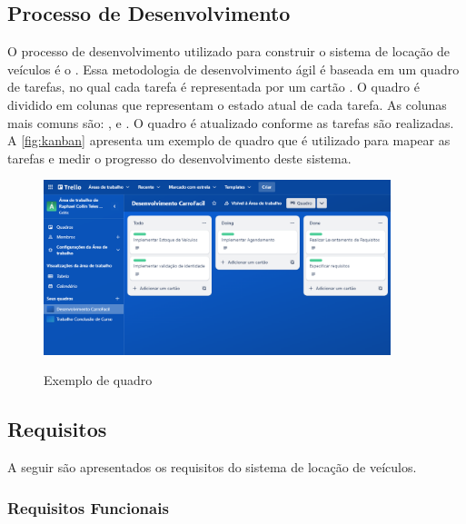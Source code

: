 \subsection{Processo de Desenvolvimento}
\label{section:processo_desenvolvimento}
O processo de desenvolvimento utilizado para construir o sistema de locação de veículos é o . Essa metodologia de desenvolvimento ágil é baseada em um quadro de tarefas, no qual cada tarefa é representada por um cartão \cite{gomes2014agile}. O quadro é dividido em colunas que representam o estado atual de cada tarefa. As colunas mais comuns são: ,  e . O quadro é atualizado conforme as tarefas são realizadas. A \autoref{fig:kanban} apresenta um exemplo de quadro  que é utilizado para mapear as tarefas e medir o progresso do desenvolvimento deste sistema.

\begin{figure}[h]
    \centering
    \caption{Exemplo de quadro }
    \includegraphics[width=0.9\textwidth]{media/kanban.png}
    \label{fig:kanban}
\end{figure}

\subsection{Requisitos}
A seguir são apresentados os requisitos do sistema de locação de veículos.
\subsubsection{Requisitos Funcionais}

